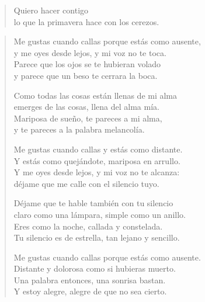 \documentclass[12pt]{article}
\begin{document}
\begin{verse}
Quiero hacer contigo\\
lo que la primavera hace con los cerezos.

\end{verse}

\clearpage
{}
\begin{verse}

Me gustas cuando callas porque estás como ausente,\\
y me oyes desde lejos, y mi voz no te toca.\\
Parece que los ojos se te hubieran volado\\
y parece que un beso te cerrara la boca.  

Como todas las cosas están llenas de mi alma\\
emerges de las cosas, llena del alma mía.\\
Mariposa de sueño, te pareces a mi alma,\\
y te pareces a la palabra melancolía.  

Me gustas cuando callas y estás como distante.\\
Y estás como quejándote, mariposa en arrullo.\\
Y me oyes desde lejos, y mi voz no te alcanza:\\
déjame que me calle con el silencio tuyo.  

Déjame que te hable también con tu silencio\\
claro como una lámpara, simple como un anillo.\\
Eres como la noche, callada y constelada.\\
Tu silencio es de estrella, tan lejano y sencillo.  

Me gustas cuando callas porque estás como ausente.\\
Distante y dolorosa como si hubieras muerto.\\
Una palabra entonces, una sonrisa bastan.\\
Y estoy alegre, alegre de que no sea cierto.

\end{verse}
\end{document}
